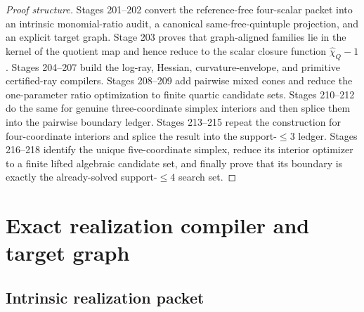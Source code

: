 \begin{proof}[Proof structure]
Stages 201--202 convert the reference-free four-scalar packet into an intrinsic monomial-ratio audit, a canonical same-free-quintuple projection, and an explicit target graph.  Stage 203 proves that graph-aligned families lie in the kernel of the quotient map and hence reduce to the scalar closure function \(\widehat\chi_Q-1\).  Stages 204--207 build the log-ray, Hessian, curvature-envelope, and primitive certified-ray compilers.  Stages 208--209 add pairwise mixed cones and reduce the one-parameter ratio optimization to finite quartic candidate sets.  Stages 210--212 do the same for genuine three-coordinate simplex interiors and then splice them into the pairwise boundary ledger.  Stages 213--215 repeat the construction for four-coordinate interiors and splice the result into the support-\(\le3\) ledger.  Stages 216--218 identify the unique five-coordinate simplex, reduce its interior optimizer to a finite lifted algebraic candidate set, and finally prove that its boundary is exactly the already-solved support-\(\le4\) search set.
\end{proof}

\section{Exact realization compiler and target graph}
\label{sec:app-part06-realization-compiler-and-target-graph}

\subsection{Intrinsic realization packet}
\label{subsec:app-part06-intrinsic-realization-packet}

